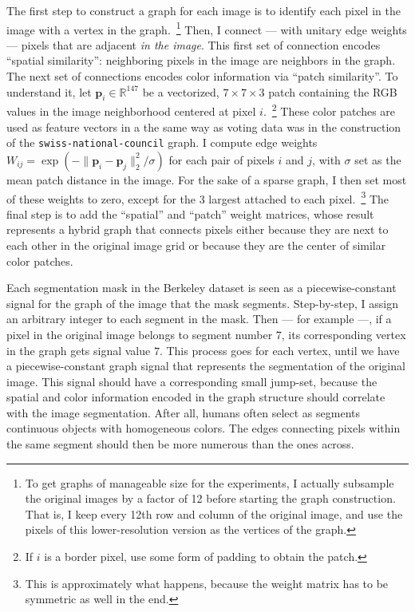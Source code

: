 The first step to construct a graph for each image is to identify each pixel in the image with a vertex in the graph.~\footnote{To get graphs of manageable size for the experiments, I actually subsample the original images by a factor of 12 before starting the graph construction. That is, I keep every 12th row and column of the original image, and use the pixels of this lower-resolution version as the vertices of the graph.} Then, I connect --- with unitary edge weights --- pixels that are adjacent \emph{in the image}. This first set of connection encodes ``spatial similarity'': neighboring pixels in the image are neighbors in the graph. The next set of connections encodes color information via ``patch similarity''. To understand it, let $\mathbf{p}_i \in \mathbb{R}^{147}$ be a vectorized, $7 \times 7 \times 3$ patch containing the RGB values in the image neighborhood centered at pixel $i$.~\footnote{If $i$ is a border pixel, use some form of padding to obtain the patch.} These color patches are used as feature vectors in a the same way as voting data was in the construction of the \texttt{swiss-national-council} graph. I compute edge weights $W_{ij} = \exp \left ( -\| \mathbf{p}_i - \mathbf{p}_j \|_2^2 / \sigma \right )$ for each pair of pixels $i$ and $j$, with $\sigma$ set as the mean patch distance in the image. For the sake of a sparse graph, I then set most of these weights to zero, except for the 3 largest attached to each pixel.~\footnote{This is approximately what happens, because the weight matrix has to be symmetric as well in the end.} The final step is to add the ``spatial'' and ``patch'' weight matrices, whose result represents a hybrid graph that connects pixels either because they are next to each other in the original image grid or because they are the center of similar color patches.

Each segmentation mask in the Berkeley dataset is seen as a piecewise-constant signal for the graph of the image that the mask segments. Step-by-step, I assign an arbitrary integer to each segment in the mask. Then --- for example ---, if a pixel in the original image belongs to segment number 7, its corresponding vertex in the graph gets signal value $7$. This process goes for each vertex, until we have a piecewise-constant graph signal that represents the segmentation of the original image. This signal should have a corresponding small jump-set, because the spatial and color information encoded in the graph structure should correlate with the image segmentation. After all, humans often select as segments continuous objects with homogeneous colors. The edges connecting pixels within the same segment should then be more numerous than the ones across.

